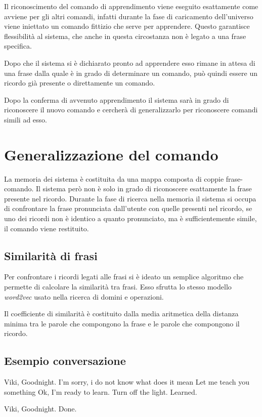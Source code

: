 \documentclass[twoside]{supsistudent}
\begin{document}
Il riconoscimento del comando di apprendimento viene eseguito esattamente come avviene per gli altri comandi, infatti durante la fase di caricamento dell'universo viene iniettato un comando fittizio che serve per apprendere. Questo garantisce flessibilità al sistema, che anche in questa circostanza non è legato a una frase specifica.

Dopo che il sistema si è dichiarato pronto ad apprendere esso rimane in attesa di una frase dalla quale è in grado di determinare un comando, può quindi essere un ricordo già presente o direttamente un comando.

Dopo la conferma di avvenuto apprendimento il sistema sarà in grado di riconoscere il nuovo comando e cercherà di generalizzarlo per riconoscere comandi simili ad esso.
\section{Generalizzazione del comando}
La memoria dei sistema è costituita da una mappa composta di coppie frase-comando. Il sistema però non è solo in grado di riconoscere esattamente la frase presente nel ricordo.
Durante la fase di ricerca nella memoria il sistema si occupa di confrontare la frase pronunciata dall'utente con quelle presenti nel ricordo, se uno dei ricordi non è identico a quanto pronunciato, ma è sufficientemente simile, il comando viene restituito.
\subsection{Similarità di frasi}
Per confrontare i ricordi legati alle frasi si è ideato un semplice algoritmo che permette di calcolare la similarità tra frasi. Esso sfrutta lo stesso modello \textit{word2vec} usato nella ricerca di domini e operazioni.

Il coefficiente di similarità è costituito dalla media aritmetica della distanza minima tra le parole che compongono la frase e le parole che compongono il ricordo.

\subsection{Esempio conversazione}
\begin{dialogue}
 Viki, Goodnight.
 I'm sorry, i do not know what does it mean
 Let me teach you something
 Ok, I'm ready to learn.
 Turn off the light.
 Learned.
\end{dialogue}
\begin{dialogue}
 Viki, Goodnight.
 Done.
\end{dialogue}
\end{document}
